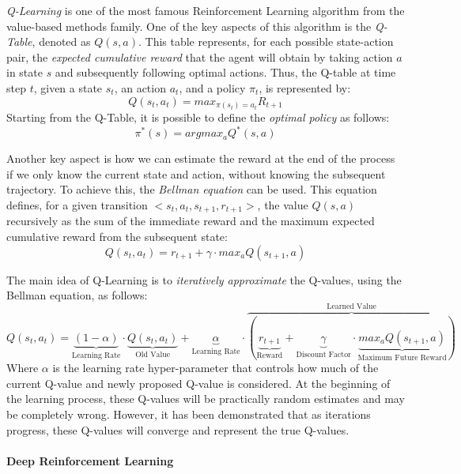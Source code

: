 \documentclass[12pt,a4paper,openright,twoside]{book}
\begin{document}
\emph{Q-Learning} is one of the most famous Reinforcement Learning algorithm from the value-based methods family. 
    One of the key aspects of this algorithm is the \emph{Q-Table}, denoted as $Q(s,a)$. This table represents, 
    for each possible state-action pair, the \emph{expected cumulative reward} that the agent will obtain by
    taking action $a$ in state $s$ and subsequently following optimal actions. 
    Thus, the Q-table at time step $t$, given a state $s_t$, an action $a_t$, and a policy $\pi_t$, is represented by:
    $$ Q(s_t, a_t) = max_{\pi(s_t) = a_t} R_{t+1}$$
    Starting from the Q-Table, it is possible to define the \emph{optimal policy} as follows:
    $$ \pi^{*}(s) = argmax_a Q^{*}(s,a) $$

Another key aspect is how we can estimate the reward at the end of the process if we only know the current state 
    and action, without knowing the subsequent trajectory. To achieve this, the \emph{Bellman equation} can be used. 
    This equation defines, for a given transition $<s_t, a_t, s_{t+1}, r_{t+1}>$, the value $Q(s,a)$ recursively 
    as the sum of the immediate reward and the maximum expected cumulative reward from the subsequent state:
    $$ Q(s_t,a_t) =  r_{t+1} + \gamma \cdot max_a Q(s_{t+1}, a)$$

The main idea of Q-Learning is to \emph{iteratively approximate} the Q-values, using the Bellman equation, as follows:
\[
Q(s_t,a_t) = 
    \underbrace{
        (1-\alpha) 
    }_\text{Learning Rate}   
    \cdot 
    \underbrace{
        Q(s_t,a_t) 
    }_\text{Old Value}
    + 
    \underbrace{
        \alpha
    }_\text{Learning Rate}
    \cdot 
    \overbrace{
        (
        \underbrace{
            r_{t+1}
        }_\text{Reward}
        + 
        \underbrace{
            \gamma
        }_\text{Discount Factor}
        \cdot 
        \underbrace{
        max_a Q(s_{t+1}, a)
        }_\text{Maximum Future Reward}
        )
    }^\text{Learned Value}
\]
    Where $\alpha$ is the learning rate hyper-parameter that controls how much of the current Q-value and newly proposed
    Q-value is considered.
    At the beginning of the learning process, these Q-values will be practically random estimates and may be completely wrong. 
    However, it has been demonstrated that as iterations progress, these Q-values will 
    converge and represent the true Q-values.

\paragraph{Deep Reinforcement Learning}
\end{document}
